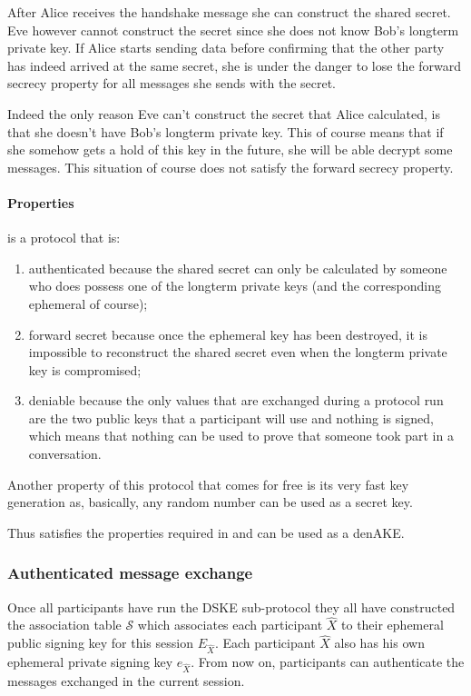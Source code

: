 After Alice receives the handshake message she can construct the shared secret. Eve
however cannot construct the secret since she does not know Bob's longterm
private key. If Alice starts sending data before confirming that the other party
has indeed arrived at the same secret, she is under the danger to lose the forward
secrecy property for all messages she sends with the secret.

Indeed the only reason Eve can't construct the secret that Alice calculated, is
that she doesn't have Bob's longterm private key. This of course means that if
she somehow gets a hold of this key in the future, she will be able decrypt some messages. This situation of course does not satisfy the forward secrecy property.


\paragraph{Properties}
\tdhname is a protocol that is:

\begin{enumerate}

  \item authenticated because the shared secret can only be calculated by someone who does possess one of the longterm private keys (and the corresponding ephemeral of course);

  \item forward secret because once the ephemeral key has been destroyed, it is impossible to reconstruct the shared secret even when the longterm private key is compromised;

  \item deniable because the only values that are exchanged during a protocol run are the two public keys that a participant will use and nothing is signed, which means that nothing can be used to prove that someone took part in a conversation.

\end{enumerate}

Another property of this protocol that comes for free is its very fast key generation
as, basically, any random number can be used as a secret key.

Thus \tdhname satisfies the properties required in \cite{mpotr} and
can be used as a denAKE.

\subsubsection{Authenticated message exchange}
Once all participants have run the DSKE sub-protocol they all have constructed the association table $\mathcal{S}$ which associates each participant $\hat{X}$ to their ephemeral public signing key for this session $E_{\hat{X}}$. Each participant $\hat{X}$ also has his own ephemeral private signing key $e_{\hat{X}}$. From now on, participants can authenticate the messages exchanged in the current session.

